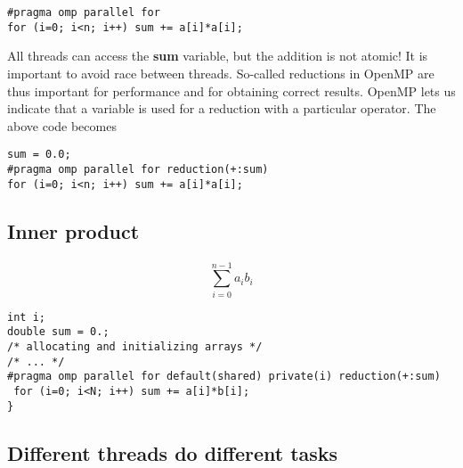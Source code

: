 \documentclass[%
oneside,                 %
final,                   %
10pt]{article}
\begin{document}
\begin{verbatim}
#pragma omp parallel for
for (i=0; i<n; i++) sum += a[i]*a[i];

\end{verbatim}

All threads can access the \textbf{sum} variable, but the addition is not atomic! It is important to avoid race between threads. So-called reductions in OpenMP are thus important for performance and for obtaining correct results.  OpenMP lets us indicate that a variable is used for a reduction with a particular operator. The above code becomes




\begin{verbatim}
sum = 0.0;
#pragma omp parallel for reduction(+:sum)
for (i=0; i<n; i++) sum += a[i]*a[i];

\end{verbatim}



\subsection*{Inner product}

\paragraph{}
\[
\sum_{i=0}^{n-1} a_ib_i
\]








\begin{verbatim}
int i;
double sum = 0.;
/* allocating and initializing arrays */
/* ... */
#pragma omp parallel for default(shared) private(i) reduction(+:sum)
 for (i=0; i<N; i++) sum += a[i]*b[i];
}

\end{verbatim}



\subsection*{Different threads do different tasks}
\end{document}
